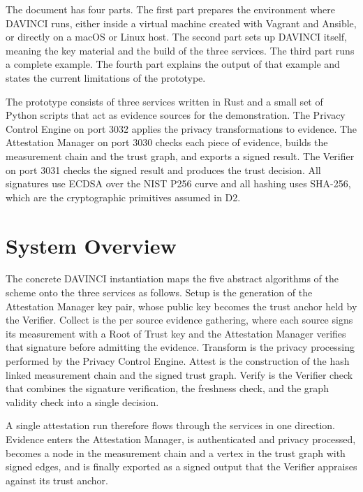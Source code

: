 \documentclass[11pt,a4paper]{article}
\begin{document}
The document has four parts. The first part prepares the environment where
DAVINCI runs, either inside a virtual machine created with Vagrant and Ansible,
or directly on a macOS or Linux host. The second part sets up DAVINCI itself,
meaning the key material and the build of the three services. The third part
runs a complete example. The fourth part explains the output of that example and
states the current limitations of the prototype.

The prototype consists of three services written in Rust and a small set of
Python scripts that act as evidence sources for the demonstration. The Privacy
Control Engine on port 3032 applies the privacy transformations to evidence. The
Attestation Manager on port 3030 checks each piece of evidence, builds the
measurement chain and the trust graph, and exports a signed result. The Verifier
on port 3031 checks the signed result and produces the trust decision. All
signatures use ECDSA over the NIST P256 curve and all hashing uses SHA-256,
which are the cryptographic primitives assumed in D2.

\section{System Overview}

The concrete DAVINCI instantiation maps the five abstract algorithms of the
scheme onto the three services as follows. Setup is the generation of the
Attestation Manager key pair, whose public key becomes the trust anchor held by
the Verifier. Collect is the per source evidence gathering, where each source
signs its measurement with a Root of Trust key and the Attestation Manager
verifies that signature before admitting the evidence. Transform is the privacy
processing performed by the Privacy Control Engine. Attest is the construction of
the hash linked measurement chain and the signed trust graph. Verify is the
Verifier check that combines the signature verification, the freshness check, and
the graph validity check into a single decision.

A single attestation run therefore flows through the services in one direction.
Evidence enters the Attestation Manager, is authenticated and privacy processed,
becomes a node in the measurement chain and a vertex in the trust graph with
signed edges, and is finally exported as a signed output that the Verifier
appraises against its trust anchor.

\end{document}
